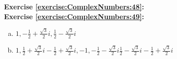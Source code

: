 \noindent\textbf{Exercise \ref{exercise:ComplexNumbers:48}:}\\

\noindent\textbf{Exercise \ref{exercise:ComplexNumbers:49}:}
\begin{enumerate}[(a)]
\item
$1, -\displaystyle\frac{1}{2}+\displaystyle\frac{\sqrt{3}}{2}i, \displaystyle\frac{1}{2}-\displaystyle\frac{\sqrt{3}}{2}i$
\item
$1, 
\displaystyle\frac{1}{2}+\displaystyle\frac{\sqrt{3}}{2}i
-\displaystyle\frac{1}{2}+\displaystyle\frac{\sqrt{3}}{2}i,
-1, 
-\displaystyle\frac{1}{2}-\displaystyle\frac{\sqrt{3}}{2}i
\displaystyle\frac{1}{2}-\displaystyle\frac{\sqrt{3}}{2}i
-\displaystyle\frac{1}{2}+\displaystyle\frac{\sqrt{3}}{2}i
$
\end{enumerate}

